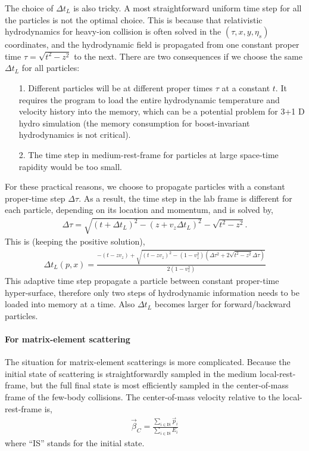 The choice of $\Delta t_L$ is also tricky. 
A most straightforward uniform time step for all the particles is not the optimal choice.
This is because that relativistic hydrodynamics for heavy-ion collision is often solved in the $(\tau,x,y,\eta_s)$ coordinates, and the hydrodynamic field is propagated from one constant proper time $\tau = \sqrt{t^2 - z^2}$ to the next.
There are two consequences if we choose the same $\Delta t_L$ for all particles:
\begin{itemize}
\item[1.] Different particles will be at different proper times $\tau$ at a constant $t$. It requires the program to load the entire hydrodynamic temperature and velocity history into the memory, which can be a potential problem for 3+1 D hydro simulation (the memory consumption for boost-invariant hydrodynamics is not critical).
\item[2.] The time step in medium-rest-frame for particles at large space-time rapidity would be too small.
\end{itemize}
For these practical reasons, we choose to propagate particles with a constant proper-time step $\Delta \tau$. 
As a result, the time step in the lab frame is different for each particle, depending on its location and momentum, and is solved by,
\begin{eqnarray}
\Delta \tau = \sqrt{(t+\Delta t_L)^2 - (z+v_z \Delta t_L)^2} - \sqrt{t^2 - z^2}.
\end{eqnarray}
This is (keeping the positive solution),
\begin{eqnarray}
\Delta t_L(p, x) = \frac{-(t-z v_z) + \sqrt{(t-z v_z)^2 - (1-v_z^2)(\Delta \tau^2 + 2\sqrt{t^2 - z^2}\Delta \tau )}}{2(1-v_z^2)}
\label{eq:dt-transformation}
\end{eqnarray}
This adaptive time step propagate a particle between constant proper-time hyper-surface, therefore only two steps of hydrodynamic information needs to be loaded into memory at a time.
Also $\Delta t_L$ becomes larger for forward/backward particles.

\paragraph{For matrix-element scattering} The situation for matrix-element scatterings is more complicated.
Because the initial state of scattering is straightforwardly sampled in the medium local-rest-frame, but the full final state is most efficiently sampled in the center-of-mass frame of the few-body collisions.
The center-of-mass velocity relative to the local-rest-frame is,
\begin{eqnarray}
\vec{\beta}_{C} = \frac{\sum_{i\in \textrm{IS}} \vec{p}_i}{\sum_{i\in \textrm{IS}} E_i}
\end{eqnarray}
where ``IS'' stands for the initial state.

